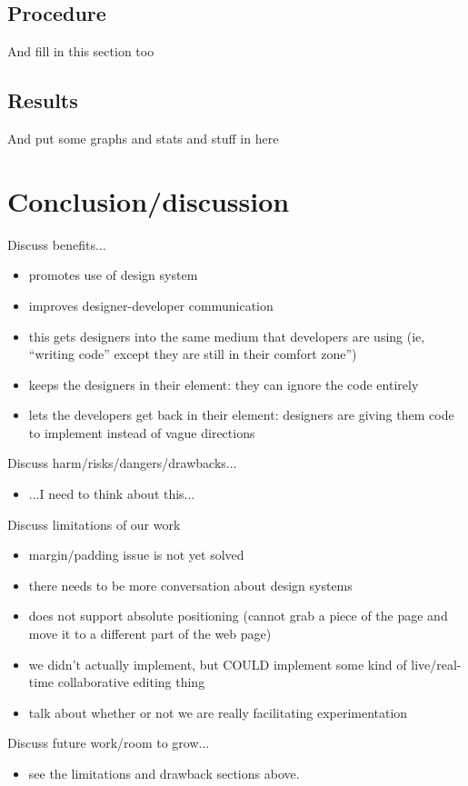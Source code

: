 \documentclass{sigchi}
\begin{document}
\subsection{Procedure}
And fill in this section too

\subsection{Results}
And put some graphs and stats and stuff in here

\section{Conclusion/discussion}
Discuss benefits...
\begin{itemize}
    \item promotes use of design system
    \item improves designer-developer communication
    \item this gets designers into the same medium that developers are using (ie, ``writing code'' except they are still in their comfort zone'')
    \item keeps the designers in their element: they can ignore the code entirely
    \item lets the developers get back in their element: designers are giving them code to implement instead of vague directions 

\end{itemize}

Discuss harm/risks/dangers/drawbacks...
\begin{itemize}
    \item ...I need to think about this...
\end{itemize}

Discuss limitations of our work 
\begin{itemize}
    \item margin/padding issue is not yet solved
    \item there needs to be more conversation about design systems
    \item does not support absolute positioning (cannot grab a piece of the page and move it to a different part of the web page)
    \item we didn't actually implement, but COULD implement some kind of live/real-time collaborative editing thing
    \item talk about whether or not we are really facilitating experimentation

\end{itemize}

Discuss future work/room to grow...
\begin{itemize}
    \item see the limitations and drawback sections above. 
\end{itemize}


\balance{}



\end{document}
